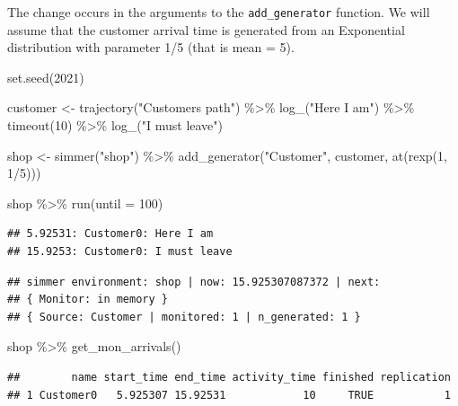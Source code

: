 \documentclass[
]{book}
\newenvironment{Shaded}{\begin{snugshade}}{\end{snugshade}}
\newcommand{\AttributeTok}[1]{\textcolor[rgb]{0.77,0.63,0.00}{#1}}
\newcommand{\DecValTok}[1]{\textcolor[rgb]{0.00,0.00,0.81}{#1}}
\newcommand{\FunctionTok}[1]{\textcolor[rgb]{0.00,0.00,0.00}{#1}}
\newcommand{\NormalTok}[1]{#1}
\newcommand{\OtherTok}[1]{\textcolor[rgb]{0.56,0.35,0.01}{#1}}
\newcommand{\SpecialCharTok}[1]{\textcolor[rgb]{0.00,0.00,0.00}{#1}}
\newcommand{\StringTok}[1]{\textcolor[rgb]{0.31,0.60,0.02}{#1}}
\begin{document}
The change occurs in the arguments to the \texttt{add\_generator} function. We will assume that the customer arrival time is generated from an Exponential distribution with parameter 1/5 (that is mean = 5).

\begin{Shaded}
\begin{Highlighting}[]
\FunctionTok{set.seed}\NormalTok{(}\DecValTok{2021}\NormalTok{)}

\NormalTok{customer }\OtherTok{\textless{}{-}}
  \FunctionTok{trajectory}\NormalTok{(}\StringTok{"Customer\textquotesingle{}s path"}\NormalTok{) }\SpecialCharTok{\%\textgreater{}\%}
  \FunctionTok{log\_}\NormalTok{(}\StringTok{"Here I am"}\NormalTok{) }\SpecialCharTok{\%\textgreater{}\%}
  \FunctionTok{timeout}\NormalTok{(}\DecValTok{10}\NormalTok{) }\SpecialCharTok{\%\textgreater{}\%}
  \FunctionTok{log\_}\NormalTok{(}\StringTok{"I must leave"}\NormalTok{)}

\NormalTok{shop }\OtherTok{\textless{}{-}}
  \FunctionTok{simmer}\NormalTok{(}\StringTok{"shop"}\NormalTok{) }\SpecialCharTok{\%\textgreater{}\%}
  \FunctionTok{add\_generator}\NormalTok{(}\StringTok{"Customer"}\NormalTok{, customer, }\FunctionTok{at}\NormalTok{(}\FunctionTok{rexp}\NormalTok{(}\DecValTok{1}\NormalTok{, }\DecValTok{1}\SpecialCharTok{/}\DecValTok{5}\NormalTok{)))}

\NormalTok{shop }\SpecialCharTok{\%\textgreater{}\%} \FunctionTok{run}\NormalTok{(}\AttributeTok{until =} \DecValTok{100}\NormalTok{)}
\end{Highlighting}
\end{Shaded}

\begin{verbatim}
## 5.92531: Customer0: Here I am
## 15.9253: Customer0: I must leave
\end{verbatim}

\begin{verbatim}
## simmer environment: shop | now: 15.925307087372 | next: 
## { Monitor: in memory }
## { Source: Customer | monitored: 1 | n_generated: 1 }
\end{verbatim}

\begin{Shaded}
\begin{Highlighting}[]
\NormalTok{shop }\SpecialCharTok{\%\textgreater{}\%} \FunctionTok{get\_mon\_arrivals}\NormalTok{()}
\end{Highlighting}
\end{Shaded}

\begin{verbatim}
##        name start_time end_time activity_time finished replication
## 1 Customer0   5.925307 15.92531            10     TRUE           1
\end{verbatim}
\end{document}
